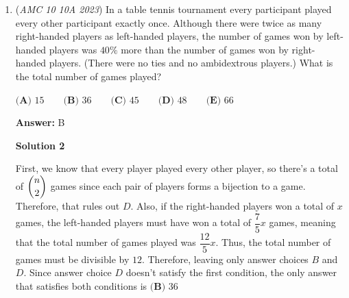 \begin{enumerate}
After first observing the problem, we can work out a few of the areas.

 1st area = $4\pi-\pi = 3\pi$

 2nd area = $16\pi-9\pi = 7\pi$

 3rd area = $36\pi-25\pi = 11\pi$

 4th area = $64\pi-49\pi = 15\pi$

 Notice that the area of the shaded region is $3\pi+7\pi+11\pi+15\pi...+(4n-1)\pi$ for any even number $n$.

 We can create a formula to compute this sum by doing:$3\pi+7\pi+11\pi+15\pi...+(4n-1)\pi$+$(4n-1)\pi+...15\pi+11\pi+7\pi+3\pi$to get$(4n+2)*\frac{n}{2} \to (2n^2+n)\pi$It is important to realize that each $n$ is $2$ circles, the unshaded and the shaded.So that means for each answer choice there are $2x$ as many circles. Then we just plug in values (strategically) to get that $2*(\frac{64}{2})^2+(\frac{64}{2})$ or $\boxed{\textbf{(E) } 64}$ as the answer.

 \textit{ ~Education, the Study of Everything }

 


	\item (\textit{AMC 10 10A 2023}) In a table tennis tournament every participant played every other participant exactly once. Although there were twice as many right-handed players as left-handed players, the number of games won by left-handed players was $40\%$ more than the number of games won by right-handed players. (There were no ties and no ambidextrous players.) What is the total number of games played?


 $\textbf{(A) }15\qquad\textbf{(B) }36\qquad\textbf{(C) }45\qquad\textbf{(D) }48\qquad\textbf{(E) }66$

 \textbf{Answer: }B



\textbf{Solution 2}

First, we know that every player played every other player, so there's a total of $\dbinom{n}{2}$ games since each pair of players forms a bijection to a game. Therefore, that rules out $D$. Also, if the right-handed players won a total of $x$ games, the left-handed players must have won a total of $\dfrac{7}{5}x$ games, meaning that the total number of games played was $\dfrac{12}{5}x$. Thus, the total number of games must be divisible by $12$. Therefore, leaving only answer choices $B$ and $D$. Since answer choice $D$ doesn't satisfy the first condition, the only answer that satisfies both conditions is $\boxed{\textbf{(B) }36}$


\end{enumerate}
